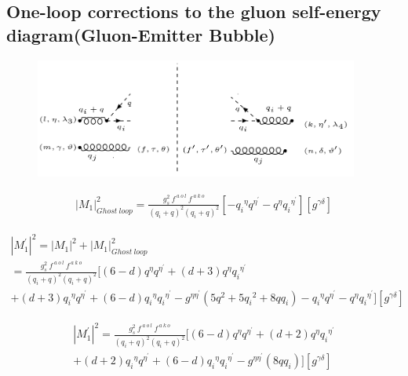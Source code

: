 \pagebreak
\subsection{One-loop corrections to the gluon self-energy diagram(Gluon-Emitter Bubble)}
\begin{figure}[h!]
\centering
\includegraphics[width=0.95\textwidth]{images/GG/Ghost.png}
\end{figure}

\begin{equation}
\begin{split}
{{|M_1|}^2_{Ghost \:loop}}=\frac{g_s^2 \:f^{\:a\:o\:l}\: f^{\:a\:k\:o}}{(q_i +q)^2 (q_i +q)^2} [-{q_i}^{{\eta}}{q}^{{\eta}^{\prime}}-{q}^{{\eta}}{q_i}^{{\eta}^{\prime}}][g^{{\gamma}{\delta}}]
\end{split}
\end{equation}

\begin{equation}
\begin{split}
{|{M}^{\prime}_1|}^2 = {|M_1|}^2+{{|M_1|}^2_{Ghost \:loop}}\\=\frac{g_s^2 \:f^{\:a\:o\:l}\: f^{\:a\:k\:o}}{(q_i +q)^2 (q_i +q)^2}  [(6-d){q}^{{\eta}}{q}^{{\eta}^{\prime}}+(d+3){q}^{{\eta}}{q_i}^{{\eta}^{\prime}}\\+(d+3){q_i}^{{\eta}}{q}^{{\eta}^{\prime}}+(6-d){q_i}^{{\eta}}{q_i}^{{\eta}^{\prime}}-g^{{\eta}{{\eta}^{\prime}}}(5{q}^2+5{q_i}^2+8qq_i)-{q_i}^{{\eta}}{q}^{{\eta}^{\prime}}-{q}^{{\eta}}{q_i}^{{\eta}^{\prime}}][g^{{\gamma}{\delta}}]
\end{split}
\end{equation}

\begin{equation}
\begin{split}
{|{M}^{\prime}_1|}^2 =\frac{g_s^2 \:f^{\:a\:o\:l}\: f^{\:a\:k\:o}}{(q_i +q)^2 (q_i +q)^2}  [(6-d){q}^{{\eta}}{q}^{{\eta}^{\prime}}+(d+2){q}^{{\eta}}{q_i}^{{\eta}^{\prime}}\\+(d+2){q_i}^{{\eta}}{q}^{{\eta}^{\prime}}+(6-d){q_i}^{{\eta}}{q_i}^{{\eta}^{\prime}}-g^{{\eta}{{\eta}^{\prime}}}(8qq_i)][g^{{\gamma}{\delta}}]
\end{split}
\end{equation}

